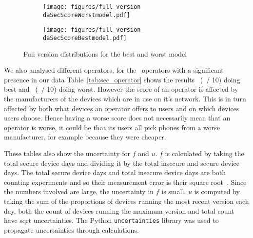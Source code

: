 \begin{figure}
 \centering
 \begin{subfigure}[b]{\columnwidth}
 \texttt{[image: figures/full\_version\_\\daSecScoreWorstmodel.pdf]}
 \caption{\daSecScoreWorstmodel}
 \label{fig:worst_model_full}
\end{subfigure}
\begin{subfigure}[b]{\columnwidth}
 \texttt{[image: figures/full\_version\_\\daSecScoreBestmodel.pdf]}
 \caption{\daSecScoreBestmodel}
 \label{fig:best_model_full}
\end{subfigure}
\caption{Full version distributions for the best and worst model}
\end{figure}

\daTabSecScoresoperator
We also analysed different operators, for the \daNumSigOperators\ operators with a significant presence in our data Table~\ref{tab:sec_operator} shows the results \daSecScoreBestoperator\ (\daSecScoreBestoperatorScore\ / 10) doing best and \daSecScoreWorstoperator\ (\daSecScoreWorstoperatorScore\ / 10) doing worst.
However the score of an operator is affected by the manufacturers of the devices which are in use on it's network.
This is in turn affected by both what devices an operator offers to users and on which devices users choose.
Hence having a worse score does not necessarily mean that an operator is worse, it could be that its users all pick phones from a worse manufacturer, for example because they were cheaper.

These tables also show the uncertainty for $f$ and $u$.
$f$ is calculated by taking the total secure device days and dividing it by the total insecure and secure device days.
The total secure device days and total insecure device days are both counting experiments and so their measurement error is their square root~\cite{Taylor1997}.
Since the numbers involved are large, the uncertainty in $f$ is small.
$u$ is computed by taking the sum of the proportions of devices running the most recent version each day, both the count of devices running the maximum version and total count have sqrt uncertainties.
The Python \texttt{uncertainties} library was used to propagate uncertainties through calculations.

